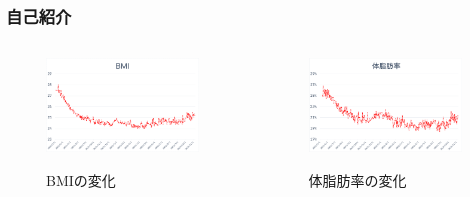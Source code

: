 \begin{frame}
  \frametitle{自己紹介}

  \begin{columns}
    \begin{column}{0.5\textwidth}
      \begin{figure}[h]
        \includegraphics[width=0.95\textwidth]{img/bmi.pdf}
        \label{fig:bmi}
        \caption{BMIの変化}
      \end{figure}

    \end{column}
    \begin{column}{0.5\textwidth}
      \begin{figure}[h]
        \includegraphics[width=0.95\textwidth]{img/fat_percentage.pdf}
        \label{fig:fat_percentage}
        \caption{体脂肪率の変化}
      \end{figure}

    \end{column}
  \end{columns}
\end{frame}

